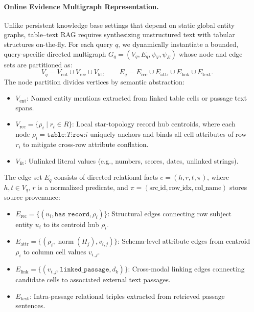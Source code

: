 \documentclass[runningheads]{llncs}
\begin{document}
\paragraph{Online Evidence Multigraph Representation.}
Unlike persistent knowledge base settings that depend on static global entity graphs, table--text RAG requires synthesizing unstructured text with tabular structures on-the-fly. For each query $q$, we dynamically instantiate a bounded, query-specific directed multigraph $G_q = (V_q, E_q, \psi_V, \psi_E)$ whose node and edge sets are partitioned as:
\begin{equation}
\label{eq:graph-partition}
V_q = V_{\text{ent}} \cup V_{\text{rec}} \cup V_{\text{lit}}, \qquad
E_q = E_{\text{rec}} \cup E_{\text{attr}} \cup E_{\text{link}} \cup E_{\text{text}}.
\end{equation}
The node partition divides vertices by semantic abstraction:
\begin{itemize}[leftmargin=1.5em]
    \item $V_{\text{ent}}$: Named entity mentions extracted from linked table cells or passage text spans.
    \item $V_{\text{rec}} = \{\rho_i \mid r_i \in R\}$: Local star-topology record hub centroids, where each node $\rho_i = \texttt{table:}T\texttt{:row:}i$ uniquely anchors and binds all cell attributes of row $r_i$ to mitigate cross-row attribute conflation.
    \item $V_{\text{lit}}$: Unlinked literal values (e.g., numbers, scores, dates, unlinked strings).
\end{itemize}
The edge set $E_q$ consists of directed relational facts $e = (h, r, t, \pi)$, where $h, t \in V_q$, $r$ is a normalized predicate, and $\pi = (\text{src\_id}, \text{row\_idx}, \text{col\_name})$ stores source provenance:
\begin{itemize}[leftmargin=1.5em]
    \item $E_{\text{rec}} = \{ (u_i, \texttt{has\_record}, \rho_i) \}$: Structural edges connecting row subject entity $u_i$ to its centroid hub $\rho_i$.
    \item $E_{\text{attr}} = \{ (\rho_i, \operatorname{norm}(H_j), v_{i,j}) \}$: Schema-level attribute edges from centroid $\rho_i$ to column cell values $v_{i,j}$.
    \item $E_{\text{link}} = \{ (v_{i,j}, \texttt{linked\_passage}, d_k) \}$: Cross-modal linking edges connecting candidate cells to associated external text passages.
    \item $E_{\text{text}}$: Intra-passage relational triples extracted from retrieved passage sentences.
\end{itemize}
\end{document}
